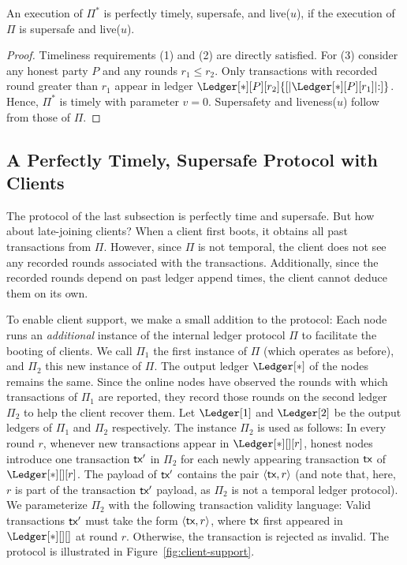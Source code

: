 \begin{theorem} \label{thm:backward-reduction}
  An execution of $\Pi^*$ is perfectly timely, supersafe, and live($u$), if the execution of
  $\Pi$ is supersafe and live($u$).
\end{theorem}
\begin{proof}
  Timeliness requirements (1) and (2) are directly satisfied.
  For (3) consider any honest party $P$ and any rounds $r_1 \leq r_2$.
  Only transactions with recorded round greater
  than $r_1$ appear in ledger $\Ledger[*][P][r_2]{[|\Ledger[*][P][r_1]|{:}]}$.
  Hence, $\Pi^*$ is timely with parameter $v = 0$.
  Supersafety and liveness($u$) follow from those of $\Pi$.
  \Qed
\end{proof}

\subsection{A Perfectly Timely, Supersafe Protocol with Clients}

The protocol of the last subsection is perfectly time and supersafe.
But how about late-joining clients?
When a client first boots, it obtains all past transactions
from $\Pi$.
However, since $\Pi$ is not temporal, the client does not see any recorded rounds
associated with the transactions. Additionally, since the recorded rounds depend
on past ledger append times, the client cannot deduce them on its own.

To enable client support, we make a small addition to the protocol:
Each node runs an \emph{additional} instance of the internal
ledger protocol $\Pi$
to facilitate the booting of clients.
We call $\Pi_1$ the first instance of $\Pi$
(which operates as before),
and $\Pi_2$ this new instance of $\Pi$.
The output ledger $\Ledger[*]$ of the nodes remains the same.
Since the online nodes have observed the rounds with which
transactions of $\Pi_1$ are reported, they record those
rounds on the second ledger $\Pi_2$ to help the client
recover them.
Let $\Ledger[1]$ and $\Ledger[2]$ be the output ledgers
of $\Pi_1$ and $\Pi_2$ respectively.
The instance $\Pi_2$ is used as follows:
In every round $r$,
whenever new transactions appear in $\Ledger[*][][r]$,
honest nodes introduce one transaction $\textsf{tx}'$ in $\Pi_2$
for each newly appearing transaction $\textsf{tx}$ of $\Ledger[*][][r]$.
The payload of $\textsf{tx}'$ contains the pair $\left<\textsf{tx}, r\right>$
(and note that, here, $r$ is part of the transaction $\textsf{tx}'$ payload,
as $\Pi_2$ is not a temporal ledger protocol).
We parameterize $\Pi_2$ with the following transaction validity language:
Valid transactions $\textsf{tx}'$ must take the form $\left<\textsf{tx}, r\right>$,
where $\textsf{tx}$ first appeared in $\Ledger[*][][]$ at round $r$.
Otherwise, the transaction is rejected as invalid.
The protocol is illustrated in Figure~\ref{fig:client-support}.

